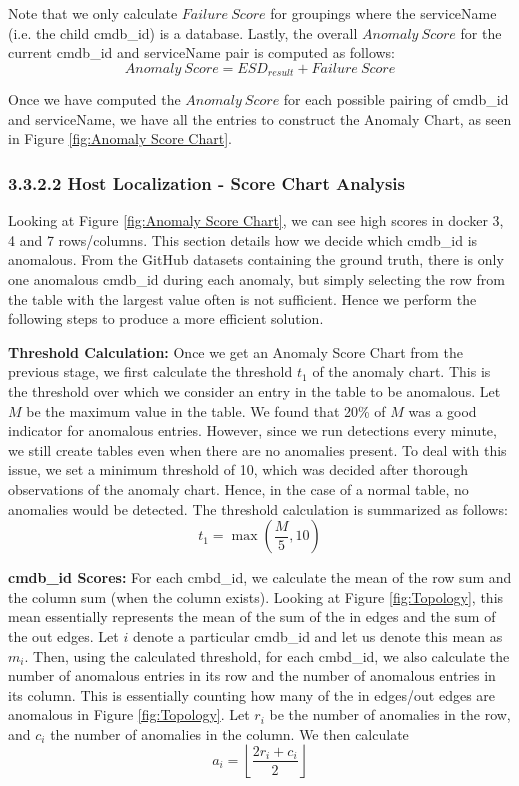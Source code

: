 \documentclass[12pt]{article}
\begin{document}
\noindent Note that we only calculate $Failure\ Score$ for groupings where the serviceName (i.e. the child cmdb\_id) is a database. Lastly, the overall $Anomaly\ Score$ for the current cmdb\_id and serviceName pair is computed as follows:
\[
    Anomaly\ Score = ESD_{result} + Failure\ Score
\]

\noindent Once we have computed the $Anomaly\ Score$ for each possible pairing of cmdb\_id and serviceName, we have all the entries to construct the Anomaly Chart, as seen in Figure \ref{fig:Anomaly Score Chart}. 

\subsubsection*{3.3.2.2 Host Localization - Score Chart Analysis}
Looking at Figure \ref{fig:Anomaly Score Chart}, we can see high scores in docker 3, 4 and 7 rows/columns. This section details how we decide which cmdb\_id is anomalous. From the GitHub datasets containing the ground truth, there is only one anomalous cmdb\_id during each anomaly, but simply selecting the row from the table with the largest value often is not sufficient. Hence we perform the following steps to produce a more efficient solution.

\smallskip
\noindent \textbf{Threshold Calculation:} Once we get an Anomaly Score Chart from the previous stage, we first calculate the threshold $t_1$ of the anomaly chart. This is the threshold over which we consider an entry in the table to be anomalous. Let $M$ be the maximum value in the table. We found that 20\% of $M$ was a good indicator for anomalous entries. However, since we run detections every minute, we still create tables even when there are no anomalies present. To deal with this issue, we set a minimum threshold of 10, which was decided after thorough observations of the anomaly chart. Hence, in the case of a normal table, no anomalies would be detected. The threshold calculation is summarized as follows:
\[
    t_1 = \max\left(\frac{M}{5}, 10\right)
\]

\noindent \textbf{cmdb\_id Scores:} For each cmbd\_id, we calculate the mean of the row sum and the column sum (when the column exists). Looking at Figure \ref{fig:Topology}, this mean essentially represents the mean of the sum of the in edges and the sum of the out edges. Let $i$ denote a particular cmdb\_id and let us denote this mean as $m_i$. Then, using the calculated threshold, for each cmbd\_id, we also calculate the number of anomalous entries in its row and the number of anomalous entries in its column. This is essentially counting how many of the in edges/out edges are anomalous in Figure \ref{fig:Topology}. Let $r_i$ be the number of anomalies in the row, and $c_i$ the number of anomalies in the column. We then calculate 
\[
    a_i = \left\lfloor\frac{2r_i + c_i}{2}\right\rfloor
\]
\end{document}
